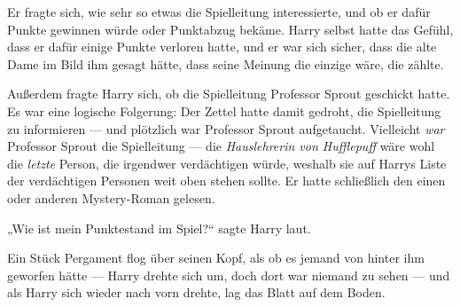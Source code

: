 Er fragte sich, wie sehr so etwas die Spielleitung interessierte, und ob er dafür Punkte gewinnen würde oder Punktabzug bekäme. Harry selbst hatte das Gefühl, dass er dafür einige Punkte verloren hatte, und er war sich sicher, dass die alte Dame im Bild ihm gesagt hätte, dass seine Meinung die einzige wäre, die zählte.

Außerdem fragte Harry sich, ob die Spielleitung Professor Sprout geschickt hatte. Es war eine logische Folgerung: Der Zettel hatte damit gedroht, die Spielleitung zu informieren — und plötzlich war Professor Sprout aufgetaucht. Vielleicht \emph{war} Professor Sprout die Spielleitung — die \emph{Hauslehrerin von Hufflepuff} wäre wohl die \emph{letzte} Person, die irgendwer verdächtigen würde, weshalb sie auf Harrys Liste der verdächtigen Personen weit oben stehen sollte. Er hatte schließlich den einen oder anderen Mystery-Roman gelesen.

„Wie ist mein Punktestand im Spiel?“ sagte Harry laut.

Ein Stück Pergament flog über seinen Kopf, als ob es jemand von hinter ihm geworfen hätte — Harry drehte sich um, doch dort war niemand zu sehen — und als Harry sich wieder nach vorn drehte, lag das Blatt auf dem Boden.

